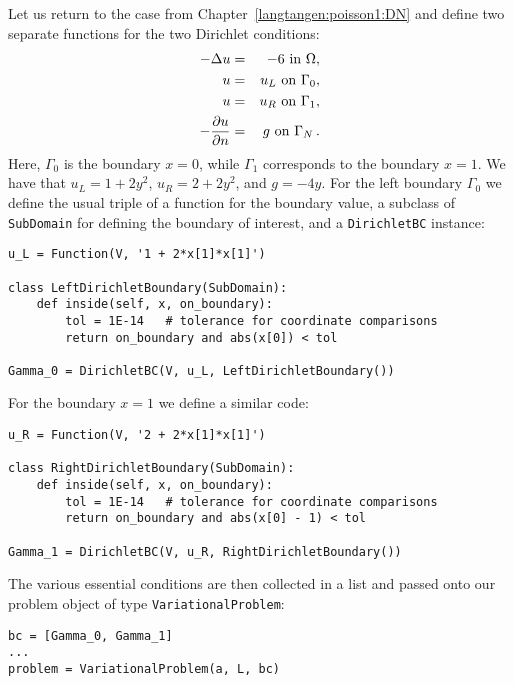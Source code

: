 Let us
return to the case from Chapter~\ref{langtangen:poisson1:DN}
and define two separate functions for
the two Dirichlet conditions:
\begin{eqnarray*}
    - \Delta u &=& -6 \mbox{ in } \Omega, \\
    u &=& u_L \mbox{ on } \Gamma_0, \\
    u &=& u_R \mbox{ on } \Gamma_1, \\
    - {\partial u\over\partial n} &=& g \mbox{ on } \Gamma_N \thinspace .
\end{eqnarray*}
Here, $\Gamma_0$ is the boundary $x=0$, while
$\Gamma_1$ corresponds to the boundary $x=1$.
We have that $u_L = 1 + 2y^2$, $u_R = 2 + 2y^2$, and $g=-4y$.
For the left boundary $\Gamma_0$ we
define
the usual triple of a function for the boundary value, 
a subclass of {\fontsize{12pt}{12pt}\texttt{SubDomain}} for defining
the boundary of interest, and a {\fontsize{12pt}{12pt}\texttt{DirichletBC}} instance:
\begin{Verbatim}[fontsize=\fontsize{10pt}{10pt},tabsize=8,baselinestretch=1.05,
fontfamily=tt,xleftmargin=7mm]
u_L = Function(V, '1 + 2*x[1]*x[1]')

class LeftDirichletBoundary(SubDomain):
    def inside(self, x, on_boundary):
        tol = 1E-14   # tolerance for coordinate comparisons
        return on_boundary and abs(x[0]) < tol

Gamma_0 = DirichletBC(V, u_L, LeftDirichletBoundary())
\end{Verbatim}
\noindent
For the boundary $x=1$ we define a similar code:
\begin{Verbatim}[fontsize=\fontsize{10pt}{10pt},tabsize=8,baselinestretch=1.05,
fontfamily=tt,xleftmargin=7mm]
u_R = Function(V, '2 + 2*x[1]*x[1]')

class RightDirichletBoundary(SubDomain):
    def inside(self, x, on_boundary):
        tol = 1E-14   # tolerance for coordinate comparisons
        return on_boundary and abs(x[0] - 1) < tol
 
Gamma_1 = DirichletBC(V, u_R, RightDirichletBoundary())
\end{Verbatim}
\noindent
The various essential conditions are then collected in a list
and passed onto our problem object of type {\fontsize{12pt}{12pt}\texttt{VariationalProblem}}:
\begin{Verbatim}[fontsize=\fontsize{10pt}{10pt},tabsize=8,baselinestretch=1.05,
fontfamily=tt,xleftmargin=7mm]
bc = [Gamma_0, Gamma_1]
...
problem = VariationalProblem(a, L, bc)
\end{Verbatim}
\noindent

